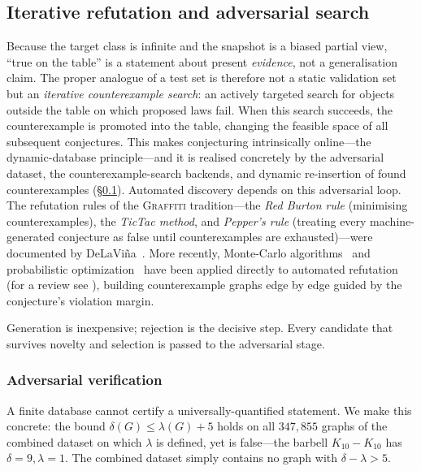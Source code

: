 \documentclass[]{ceurart}
\begin{document}
\subsection{Iterative refutation and adversarial search}
\label{sec:refute}
Because the target class is infinite and the snapshot is a biased partial view,
``true on the table'' is a statement about present \emph{evidence}, not a
generalisation claim. The proper analogue of a test set is therefore not a
static validation set but an \emph{iterative counterexample search}: an actively targeted
search for objects outside the table on which proposed laws fail. When this search
succeeds, the counterexample is promoted into the table, changing the feasible
space of all subsequent conjectures. This makes conjecturing intrinsically
online---the dynamic-database principle---and it is realised concretely by the
adversarial dataset, the counterexample-search backends, and dynamic re-insertion
of found counterexamples (\S\ref{sec:refute}). Automated discovery depends on this adversarial loop.
The refutation rules of the \textsc{Graffiti} tradition---the \emph{Red Burton rule} (minimising counterexamples), the \emph{TicTac method}, and \emph{Pepper's rule} (treating every machine-generated conjecture as false until counterexamples are exhausted)---were documented by DeLaVi\~na~\cite{delavina2004history}. More recently, Monte-Carlo algorithms~\cite{cazenave2009nested,rosin2011nested} and probabilistic optimization~\cite{wagner2021constructions} have been applied directly to automated refutation (for a review see \cite{jooken2025computer}), building counterexample graphs edge by edge guided by the conjecture's violation margin.

Generation is inexpensive; rejection is the decisive step. Every candidate
that survives novelty and selection is passed to the adversarial stage.

\subsubsection{Adversarial verification}
\label{sec:adv}
A finite database cannot certify a universally-quantified statement. We make
this concrete: the bound $\delta(G)\le\lambda(G)+5$ holds on all $347{,}855$
graphs of the combined dataset on which $\lambda$ is defined, yet is
false---the barbell $K_{10}\!-\!K_{10}$
has $\delta=9,\lambda=1$. The combined dataset simply contains no graph with
$\delta-\lambda>5$.
\end{document}

